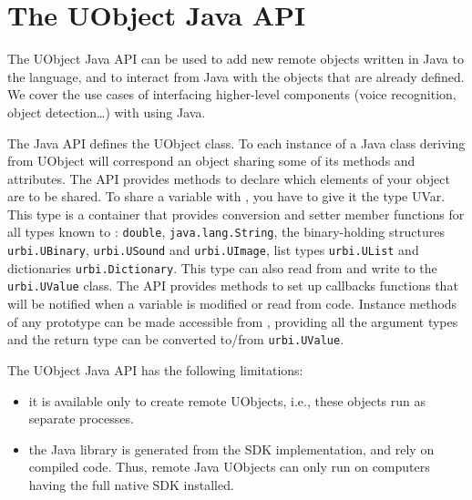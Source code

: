 
\newcommand{\indexJava}[1]{\index{#1@\lstinline{#1}!\Java}}

\chapter{The UObject Java API}
\label{sec:uob:apijava}

The UObject Java API can be used to add new remote objects written in Java
to the \us language, and to interact from Java with the objects that are
already defined. We cover the use cases of interfacing higher-level
components (voice recognition, object detection\ldots) with \urbi using
Java.

The Java API defines the UObject class. To each instance of a Java class
deriving from UObject will correspond an \us object sharing some of its
methods and attributes. The API provides methods to declare which elements
of your object are to be shared. To share a variable with \urbi, you have to
give it the type UVar. This type is a container that provides conversion and
setter member functions for all types known to \urbi: \lstinline{double},
\lstinline{java.lang.String}, the binary-holding structures
\lstinline{urbi.UBinary}, \lstinline{urbi.USound} and
\lstinline{urbi.UImage}, list types \lstinline{urbi.UList} and dictionaries
\lstinline{urbi.Dictionary}. This type can also read from and write to the
\lstinline{urbi.UValue} class. The API provides methods to set up callbacks
functions that will be notified when a variable is modified or read from \us
code. Instance methods of any prototype can be made accessible from \us,
providing all the argument types and the return type can be converted
to/from \lstinline{urbi.UValue}.

The UObject Java API has the following limitations:
\begin{itemize}
\item it is available only to create remote UObjects, i.e., these objects
  run as separate processes.
\item the Java library is generated from the \Cxx SDK implementation, and
  rely on compiled \Cxx code. Thus, remote Java UObjects can only run on
  computers having the full \urbi native SDK installed.
\end{itemize}



